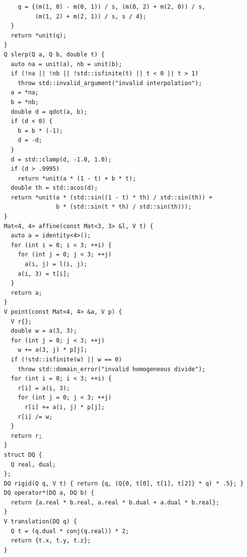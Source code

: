 \begin{verbatim}
    q = {(m(1, 0) - m(0, 1)) / s, (m(0, 2) + m(2, 0)) / s,
         (m(1, 2) + m(2, 1)) / s, s / 4};
  }
  return *unit(q);
}
Q slerp(Q a, Q b, double t) {
  auto na = unit(a), nb = unit(b);
  if (!na || !nb || !std::isfinite(t) || t < 0 || t > 1)
    throw std::invalid_argument("invalid interpolation");
  a = *na;
  b = *nb;
  double d = qdot(a, b);
  if (d < 0) {
    b = b * (-1);
    d = -d;
  }
  d = std::clamp(d, -1.0, 1.0);
  if (d > .9995)
    return *unit(a * (1 - t) + b * t);
  double th = std::acos(d);
  return *unit(a * (std::sin((1 - t) * th) / std::sin(th)) +
               b * (std::sin(t * th) / std::sin(th)));
}
Mat<4, 4> affine(const Mat<3, 3> &l, V t) {
  auto a = identity<4>();
  for (int i = 0; i < 3; ++i) {
    for (int j = 0; j < 3; ++j)
      a(i, j) = l(i, j);
    a(i, 3) = t[i];
  }
  return a;
}
V point(const Mat<4, 4> &a, V p) {
  V r{};
  double w = a(3, 3);
  for (int j = 0; j < 3; ++j)
    w += a(3, j) * p[j];
  if (!std::isfinite(w) || w == 0)
    throw std::domain_error("invalid homogeneous divide");
  for (int i = 0; i < 3; ++i) {
    r[i] = a(i, 3);
    for (int j = 0; j < 3; ++j)
      r[i] += a(i, j) * p[j];
    r[i] /= w;
  }
  return r;
}
struct DQ {
  Q real, dual;
};
DQ rigid(Q q, V t) { return {q, (Q{0, t[0], t[1], t[2]} * q) * .5}; }
DQ operator*(DQ a, DQ b) {
  return {a.real * b.real, a.real * b.dual + a.dual * b.real};
}
V translation(DQ q) {
  Q t = (q.dual * conj(q.real)) * 2;
  return {t.x, t.y, t.z};
}


\end{verbatim}
